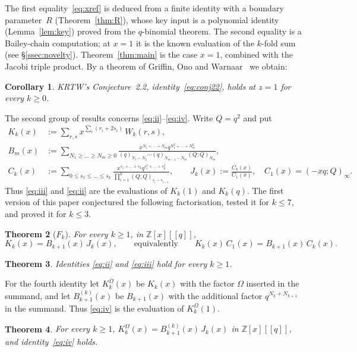 \documentclass[11pt]{amsart}
\newtheorem{theorem}{Theorem}[section]
\newtheorem{corollary}[theorem]{Corollary}
\theoremstyle{definition}
\numberwithin{equation}{section}
\newcommand{\Z}{\mathbb{Z}}
\begin{document}
The first equality~\eqref{eq:xref} is deduced from a finite identity with a boundary parameter~$R$
(Theorem~\ref{thm:R}), whose key input is a polynomial identity (Lemma~\ref{lem:key}) proved from the
$q$-binomial theorem. The second equality is a Bailey-chain computation; at $x=1$ it is the known
evaluation of the $k$-fold sum (see §\ref{ssec:novelty}). Theorem~\ref{thm:main} is the case $x=1$,
combined with the Jacobi triple product. By a theorem of Griffin, Ono and Warnaar~\cite{GOW} we obtain:

\begin{corollary}\label{cor:z1}
KRTW's Conjecture~2.2, identity~\eqref{eq:conj22}, holds at $z=1$ for every $k\ge0$.
\end{corollary}

The second group of results concerns \eqref{eq:ii}--\eqref{eq:iv}. Write $Q=q^2$ and put
\begin{align*}
K_k(x)&:=\sum_{r,s}x^{\sum_i(r_i+2s_i)}\,W_k(r,s),\\
B_m(x)&:=\sum_{N_1\ge\dots\ge N_m\ge0}\frac{x^{N_1+\dots+N_m}q^{N_1^2+\dots+N_m^2}}{(q)_{N_1-N_2}\cdots(q)_{N_{m-1}-N_m}(Q;Q)_{N_m}},\\
C_k(x)&:=\sum_{0\le s_1\le\dots\le s_k}\frac{x^{s_1+\dots+s_k}q^{s_1^2+\dots+s_k^2}}{\prod_{i=1}^k(Q;Q)_{s_i-s_{i-1}}},
\qquad J_k(x):=\frac{C_k(x)}{C_1(x)},\quad C_1(x)=(-xq;Q)_\infty .
\end{align*}
Thus \eqref{eq:iii} and \eqref{eq:ii} are the evaluations of $K_k(1)$ and $K_k(q)$. The first version of this
paper conjectured the following factorisation, tested it for $k\le7$, and proved it for $k\le3$.

\begin{theorem}[$F_k$]\label{thm:F}
For every $k\ge1$, in $\Z[x][[q]]$,
\[K_k(x)=B_{k+1}(x)\,J_k(x),\qquad\text{equivalently}\qquad K_k(x)\,C_1(x)=B_{k+1}(x)\,C_k(x).\]
\end{theorem}

\begin{theorem}\label{thm:k3}
Identities \eqref{eq:ii} and \eqref{eq:iii} hold for every $k\ge1$.
\end{theorem}

For the fourth identity let $K^\Omega_k(x)$ be $K_k(x)$ with the factor $\Omega$ inserted in the summand, and let
$B^{(k)}_{k+1}(x)$ be $B_{k+1}(x)$ with the additional factor $q^{N_k+N_{k+1}}$ in the summand. Thus \eqref{eq:iv} is the
evaluation of $K^\Omega_k(1)$.

\begin{theorem}\label{thm:iv}
For every $k\ge1$, $K^\Omega_k(x)=B^{(k)}_{k+1}(x)\,J_k(x)$ in $\Z[x][[q]]$, and identity~\eqref{eq:iv} holds.
\end{theorem}
\end{document}
